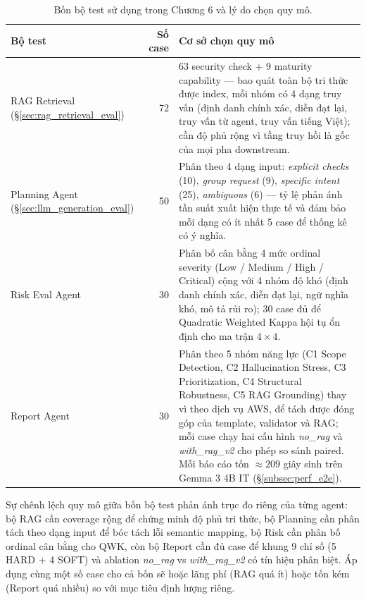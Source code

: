 \begin{table}[!htb]
  \centering
  \caption{Bốn bộ test sử dụng trong Chương 6 và lý do chọn quy mô.}
  \label{tab:testset_sizes}
  \small
  \begin{tabular}{lrp{8.5cm}}
    \toprule
    \textbf{Bộ test} & \textbf{Số case} & \textbf{Cơ sở chọn quy mô} \\
    \midrule
    RAG Retrieval (\S\ref{sec:rag_retrieval_eval})    & 72 & 63 security check + 9 maturity capability --- bao quát toàn bộ tri thức được index, mỗi nhóm có 4 dạng truy vấn (định danh chính xác, diễn đạt lại, truy vấn từ agent, truy vấn tiếng Việt); cần độ phủ rộng vì tầng truy hồi là gốc của mọi pha downstream. \\
    \addlinespace
    Planning Agent (\S\ref{sec:llm_generation_eval})  & 50 & Phân theo 4 dạng input: \emph{explicit checks} (10), \emph{group request} (9), \emph{specific intent} (25), \emph{ambiguous} (6) --- tỷ lệ phản ánh tần suất xuất hiện thực tế và đảm bảo mỗi dạng có ít nhất 5 case để thống kê có ý nghĩa. \\
    \addlinespace
    Risk Eval Agent  & 30 & Phân bố cân bằng 4 mức ordinal severity (Low / Medium / High / Critical) cộng với 4 nhóm độ khó (định danh chính xác, diễn đạt lại, ngữ nghĩa khó, mô tả rủi ro); 30 case đủ để Quadratic Weighted Kappa hội tụ ổn định cho ma trận $4\times 4$. \\
    \addlinespace
    Report Agent     & 30 & Phân theo 5 nhóm năng lực (C1 Scope Detection, C2 Hallucination Stress, C3 Prioritization, C4 Structural Robustness, C5 RAG Grounding) thay vì theo dịch vụ AWS, để tách được đóng góp của template, validator và RAG; mỗi case chạy hai cấu hình \emph{no\_rag} và \emph{with\_rag\_v2} cho phép so sánh paired. Mỗi báo cáo tốn $\approx 209$ giây sinh trên Gemma 3 4B IT (\S\ref{subsec:perf_e2e}). \\
    \bottomrule
  \end{tabular}
\end{table}

Sự chênh lệch quy mô giữa bốn bộ test phản ánh trục đo riêng của từng agent: bộ RAG cần coverage rộng để chứng minh độ phủ tri thức, bộ Planning cần phân tách theo dạng input để bóc tách lỗi semantic mapping, bộ Risk cần phân bố ordinal cân bằng cho QWK, còn bộ Report cần đủ case để khung 9 chỉ số (5 HARD + 4 SOFT) và ablation \emph{no\_rag} vs \emph{with\_rag\_v2} có tín hiệu phân biệt. Áp dụng cùng một số case cho cả bốn sẽ hoặc lãng phí (RAG quá ít) hoặc tốn kém (Report quá nhiều) so với mục tiêu định lượng riêng.

